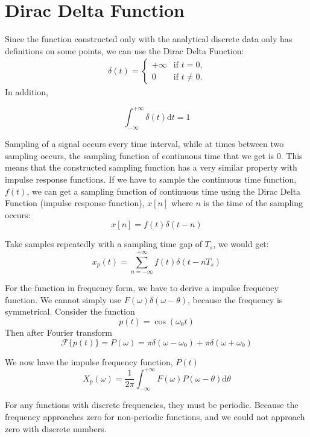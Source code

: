 \section{Dirac Delta Function}
Since the function constructed only with the analytical discrete data only has definitions on some points, 
we can use the Dirac Delta Function:
\begin{align*}
\delta(t) = \begin{cases}
    +\infty     &\text{if $t = 0$,}    \\
    0           &\text{if $t \neq 0$.}
\end{cases}
\end{align*}
In addition, 

$$\int_{-\infty}^{+\infty} \delta(t) \mathrm{d}t = 1$$

Sampling of a signal occurs every time interval, while at times between two sampling occurs, 
the sampling function of continuous time that we get is 0. 
This means that the constructed sampling function has a very similar property with impulse response functions.
If we have to sample the continuous time function, $f(t)$, 
we can get a sampling function of continuous time using the Dirac Delta Function (impulse response function), 
$x[n]$ where $n$ is the time of the sampling occurs:
$$ x[n]= f(t)\delta(t-n) $$

Take samples repeatedly with a sampling time gap of $T_s$, we would get: 
$$ x_p(t)= \sum_{n=-\infty}^{+\infty} f(t)\delta(t-nT_s) $$

For the function in frequency form, we have to derive a impulse frequency function. 
We cannot simply use $F(\omega)\delta(\omega - \theta)$, because the frequency is symmetrical. 
Consider the function $$ p(t) = \cos(\omega_0t) $$ Then after Fourier transform 
$$ \mathcal{F}\{p(t)\} = P(\omega) = \pi\delta(\omega-\omega_0) + \pi\delta(\omega+\omega_0)$$

We now have the impulse frequency function, $P(t)$
$$ X_p(\omega) = \frac{1}{2\pi} \int_{-\infty}^{+\infty} F(\omega)P(\omega-\theta) \mathrm{d}\theta $$

For any functions with discrete frequencies, they must be periodic. 
Because the frequency approaches zero for non-periodic functions, 
and we could not approach zero with discrete numbers.



